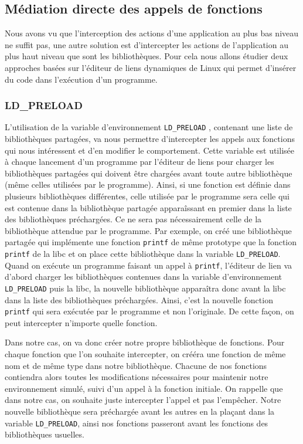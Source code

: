 \subsection{Médiation directe des appels de fonctions}

Nous avons vu que l'interception des actions d'une application au plus bas
niveau ne suffit pas, une autre solution est d'intercepter les actions de
l'application au plus haut niveau que sont les bibliothèques. Pour cela nous
allons étudier deux approches basées sur l'éditeur de liens dynamiques de Linux
qui permet d'insérer du code dans l'exécution d'un programme.

\subsubsection{LD\_PRELOAD}
\label{paragraphe:LDPreload}

L'utilisation de la variable d'environnement \texttt{LD\_PRELOAD}
\citep{LDPreload}, contenant une liste de bibliothèques partagées, va nous
permettre d'intercepter les appels aux fonctions qui nous intéressent et d'en
modifier le comportement. Cette variable est utilisée à chaque lancement d'un
programme par l'éditeur de liens pour charger les bibliothèques partagées qui
doivent être chargées avant toute autre bibliothèque (même celles utilisées par
le programme). Ainsi, si une fonction est définie dans plusieurs bibliothèques
différentes, celle utilisée par le programme sera celle qui est contenue dans la
bibliothèque partagée apparaîssant en premier dans la liste des bibliothèques
préchargées. Ce ne sera pas nécessairement celle de la bibliothèque
attendue par le programme. Par exemple, on créé une bibliothèque partagée qui
implémente une fonction \texttt{printf} de même prototype que la
fonction \texttt{printf} de la libc et on place cette bibliothèque dans la
variable \texttt{LD\_PRELOAD}. Quand on exécute un programme faisant un appel
à \texttt{printf}, l'éditeur de lien va d'abord charger les bibliothèques
contenues dans la variable d'environnement \texttt{LD\_PRELOAD} puis la libc, la
nouvelle bibliothèque apparaîtra donc avant la libc dans la liste des
bibliothèques préchargées. Ainsi, c'est la nouvelle fonction \texttt{printf}
qui sera exécutée par le programme et non l'originale. De cette façon, on peut
intercepter n'importe quelle fonction.

Dans notre cas, on va donc créer notre propre bibliothèque de fonctions. Pour
chaque fonction que l'on souhaite intercepter, on crééra une
fonction de même nom et de même type dans notre bibliothèque. Chacune de nos
fonctions contiendra alors toutes les modifications nécessaires pour maintenir
notre environnement simulé, suivi d'un appel à la fonction initiale. On rappelle
que dans notre cas, on souhaite juste intercepter l'appel et pas l'empêcher. Notre nouvelle bibliothèque sera préchargée avant les autres en la plaçant dans
la variable \texttt{LD\_PRELOAD}, ainsi nos fonctions passeront avant les
fonctions des bibliothèques usuelles.


